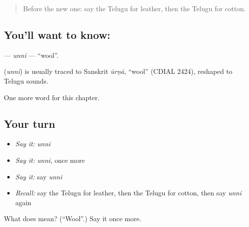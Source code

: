 \begin{quote}
Before the new one: say the Telugu for leather, then the Telugu for cotton.
\end{quote}

\subsection*{You'll want to know: }
\textbf{} — \emph{unni} — \textquotedblleft{}wool\textquotedblright{}.

\begin{cousinweb}
\textbf{} (\emph{unni}) is usually traced to Sanskrit \emph{ūrṇā}, \textquotedblleft{}wool\textquotedblright{} (CDIAL 2424), reshaped to Telugu sounds.
\end{cousinweb}

\begin{grammarlens}[title={What you've built}]
One more word for this chapter.
\end{grammarlens}

\subsection*{Your turn}
\begin{itemize}
\raggedright
  \item \emph{Say it:} \emph{unni}
  \item \emph{Say it:} \emph{unni}, once more
  \item \emph{Say it:} say \emph{unni}
  \item \emph{Recall:} say the Telugu for leather, then the Telugu for cotton, then say \emph{unni} again
\end{itemize}

\begin{tcolorbox}[breakable,colback=teal!4,colframe=teal!35!black,title={Before you move on}]
What does  mean? (\textquotedblleft{}Wool\textquotedblright{}.) Say it once more.
\end{tcolorbox}
